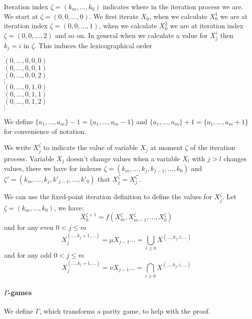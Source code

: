 Iteration index $\zeta = (k_m,\dots,k_0)$ indicates where in the iteration process we are. We start at $\zeta = (0,0,\dots,0)$. We first iterate $X_0$, when we calculate $X_0^1$ we are at iteration index $\zeta=(0,0,\dots,1)$, when we calculate $X_0^2$ we are at iteration index $\zeta=(0,0,\dots,2)$ and so on. In general when we calculate a value for $X_j^i$ then $k_j = i$ in $\zeta$. This induces the lexicographical order 
\begin{center}
	$(0,\dots,0,0,0)$\\
	$(0,\dots,0,0,1)$\\
	$(0,\dots,0,0,2)$\\
	$\vdots$\\
	$(0,\dots,0,1,0)$\\
	$(0,\dots,0,1,1)$\\
	$(0,\dots,0,1,2)$\\
	$\vdots$
\end{center}
We define $\{a_1,\dots,a_m\} -1 = \{a_1,\dots,a_m-1\}$ and $\{a_1,\dots,a_m\} + 1 = \{a_1,\dots,a_m+1\}$ for convenience of notation.

We write $X_j^\zeta$ to indicate the value of variable $X_j$ at moment $\zeta$ of the iteration process. Variable $X_j$ doesn't change values when a variable $X_l$ with $j>l$ changes values, there we have for indexes $\zeta = (k_m,\dots,k_j,k_{j-1},\dots,k_0)$ and $\zeta' = (k_m,\dots,k_j,k'_{j-1},\dots,k'_0)$ that $X_j^\zeta = X_j^{\zeta'}$.

We can use the fixed-point iteration definition to define the values for $X_j^\zeta$. Let  $\zeta= (k_m,\dots,k_0)$, we have:
\[ X_0^{\zeta+1} = f(X_m^\zeta, X_{m-1}^\zeta,\dots,X_0^\zeta) \]
and for any even $0 < j \leq m$
\[ X_j^{(\dots,k_j+1,\dots)} = \mu X_{j-1}\dots = \bigcup_{i \geq 0}X^{(\dots,k_j,i,\dots)} \]
and for any odd $0 < j \leq m$
\[ X_j^{(\dots,k_j+1,\dots)} = \nu X_{j-1}\dots = \bigcap_{i \geq 0}X^{(\dots,k_j,i,\dots)} \]

\paragraph{$\Gamma$-games} 

We define $\Gamma$, which transforms a parity game, to help with the proof.

